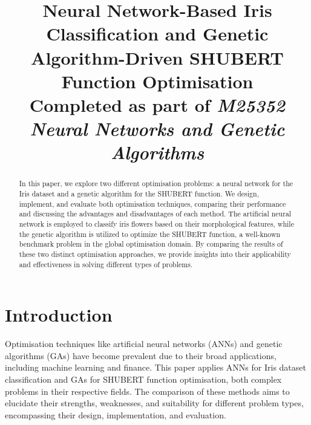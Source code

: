 \documentclass[conference]{inc/IEEEtran}
\begin{document}
\title{Neural Network-Based Iris Classification and Genetic Algorithm-Driven SHUBERT Function Optimisation \\
{\footnotesize Completed as part of \textit{M25352 Neural Networks and Genetic Algorithms}}
}


\author{
    \and
}

\maketitle

\begin{abstract}
    In this paper, we explore two different optimisation problems: a neural network for the Iris dataset and a genetic algorithm for the SHUBERT function. We design, implement, and evaluate both optimisation techniques, comparing their performance and discussing the advantages and disadvantages of each method. The artificial neural network is employed to classify iris flowers based on their morphological features, while the genetic algorithm is utilized to optimize the SHUBERT function, a well-known benchmark problem in the global optimisation domain. By comparing the results of these two distinct optimisation approaches, we provide insights into their applicability and effectiveness in solving different types of problems.
\end{abstract}

\section{Introduction}

Optimisation techniques like artificial neural networks (ANNs) and genetic algorithms (GAs) have become prevalent due to their broad applications, including machine learning and finance. This paper applies ANNs for Iris dataset classification and GAs for SHUBERT function optimisation, both complex problems in their respective fields. The comparison of these methods aims to elucidate their strengths, weaknesses, and suitability for different problem types, encompassing their design, implementation, and evaluation.
\end{document}
